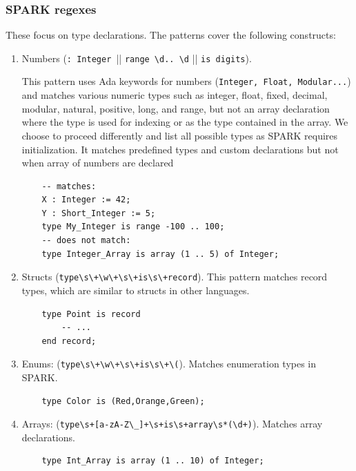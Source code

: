 \documentclass[nomenclature, english, bibtex]{kththesis}
\begin{document}
\subsubsection{SPARK regexes}

These focus on type declarations.
The patterns cover the following constructs:

\begin{enumerate}
    \item Numbers 
(\verb|: Integer ||| \verb|range \d.. \d| || \verb|is digits|).

This pattern uses Ada keywords for numbers (\texttt{Integer, Float, Modular...}) and matches various numeric types such as integer, float, fixed, decimal, modular, natural, positive, long, and range, but not an array declaration where the type is used for indexing or as the type contained in the array. We choose to proceed differently and list all possible types as SPARK requires initialization. It matches predefined types and custom declarations but not when array of numbers are declared

    \begin{verbatim}
    -- matches:
    X : Integer := 42;
    Y : Short_Integer := 5;
    type My_Integer is range -100 .. 100;
    -- does not match:
    type Integer_Array is array (1 .. 5) of Integer;
    \end{verbatim}

    \item Structs (\verb|type\s\+\w\+\s\+is\s\+record|). This pattern matches record types, which are similar to structs in other languages.

    \begin{verbatim}
    type Point is record
        -- ...
    end record;
    \end{verbatim}

    \item Enums: (\verb|type\s\+\w\+\s\+is\s\+\(|). Matches enumeration types in SPARK.

    \begin{verbatim}
    type Color is (Red,Orange,Green);
    \end{verbatim}

    \item Arrays: (\verb|type\s+[a-zA-Z\_]+\s+is\s+array\s*(\d+)|). Matches array declarations.

    \begin{verbatim}
    type Int_Array is array (1 .. 10) of Integer;
    \end{verbatim}


\end{enumerate}
\end{document}
